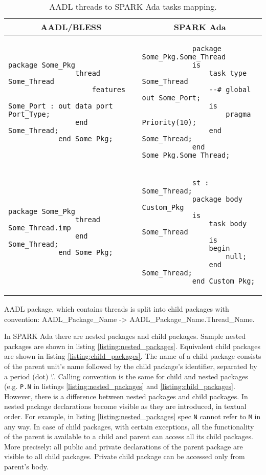 \begin{table}[!ht]
	\caption{AADL threads to SPARK Ada tasks mapping.}
	\label{table:threads2tasks}
	\centering
  	\begin{tabular}{ | p{3.5in} | p{2.5in} |}

		\hline
		\multicolumn{1}{|c|}{\textbf{AADL/BLESS}} & \multicolumn{1}{|c|}{\textbf{SPARK Ada}} \\ \hline

		\begin{lstlisting}[language=aadl]
			package Some_Pkg
				thread Some_Thread
					features
						Some_Port : out data port Port_Type;
				end Some_Thread;
			end Some_Pkg;
		\end{lstlisting} 
		& 
		\begin{lstlisting}
			package Some_Pkg.Some_Thread
			is
				task type Some_Thread
				--# global out Some_Port;
				is
					pragma Priority(10);
				end Some_Thread;
			end Some_Pkg.Some_Thread;
		\end{lstlisting} 

		\\ \hline

		\begin{lstlisting}[language=aadl]
			package Some_Pkg
				thread Some_Thread.imp
				end Some_Thread;
			end Some_Pkg;
		\end{lstlisting} 
		& 
		\begin{lstlisting}
			st : Some_Thread;
			package body Custom_Pkg
			is
				task body Some_Thread
				is
				begin
					null;
				end Some_Thread;
			end Custom_Pkg;
		\end{lstlisting} 

		\\ \hline
	\end{tabular}
\end{table}

AADL package, which contains threads is split into child packages with convention: AADL\_Package\_Name -> AADL\_Package\_Name.Thread\_Name.

In SPARK Ada there are nested packages and child packages. Sample nested packages are shown in listing \ref{listing:nested_packages}. Equivalent child packages are shown in listing \ref{listing:child_packages}. The name of a child package consists of the parent unit's name followed by the child package's identifier, separated by a period (dot) `.'. Calling convention is the same for child and nested packages (e.g. \lstinline{P.N} in listings \ref{listing:nested_packages} and \ref{listing:child_packages}. However, there is a difference between nested packages and child packages. In nested package declarations become visible as they are introduced, in textual order. For example, in listing \ref{listing:nested_packages} spec \lstinline{N} cannot refer to \lstinline{M} in any way. In case of child packages, with certain exceptions, all the functionality of the parent is available to a child and parent can access all its child packages. More precisely: all public and private declarations of the parent package are visible to all child packages. Private child package can be accessed only from parent's body.

